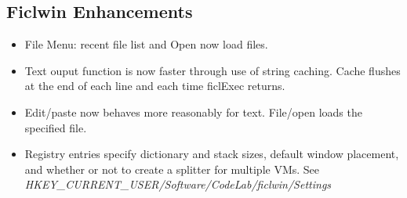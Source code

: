 \subsection*{Ficlwin Enhancements}
\begin{itemize}[noitemsep]
	\item File Menu: recent file list and Open now load files.

	\item Text ouput function is now faster through use of string
	caching. Cache flushes at the end of each line and each time
	ficlExec returns.

	\item Edit/paste now behaves more reasonably for text.
	File/open loads the specified file.

	\item Registry entries specify dictionary and stack sizes,
	default window placement, and whether or not to create a
	splitter for multiple VMs. See
	\textit{HKEY\_CURRENT\_USER/Software/CodeLab/ficlwin/Settings}
\end{itemize}


